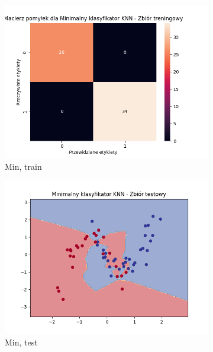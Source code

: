 \documentclass[12pt]{article}
\newcommand*{\subfigwidth}{0.24\textwidth}
\begin{document}
\begin{figure}[H]
\begin{subfigure}[t]{\subfigwidth}
        \includegraphics[width=\linewidth]{img/exp_3/knn/2_3/min/train_matrix.png}
        \caption{Min, train}
    \end{subfigure}
    \hfill
    \begin{subfigure}[t]{\subfigwidth}
        \includegraphics[width=\linewidth]{img/exp_3/knn/2_3/min/test_boundary.png}
        \caption{Min, test}
    \end{subfigure}
    \hfill
    \begin{subfigure}[t]{\subfigwidth}

\end{subfigure}
\end{figure}
\end{document}
